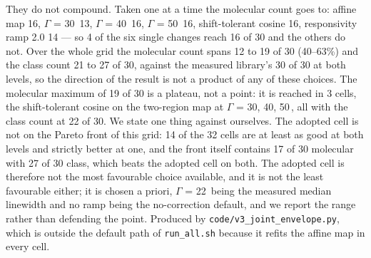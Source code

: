 \begin{table}[htbp]
\begin{flushleft}\footnotesize They do not compound. Taken one at a time the molecular count goes to: affine map 16, $\Gamma$ = 30\,\wn{} 13, $\Gamma$ = 40\,\wn{} 16, $\Gamma$ = 50\,\wn{} 16, shift-tolerant cosine 16, responsivity ramp 2.0 14 --- so 4 of the six single changes reach 16 of 30 and the others do not. Over the whole grid the molecular count spans 12 to 19 of 30 (40--63\%) and the class count 21 to 27 of 30, against the measured library's 30 of 30 at both levels, so the direction of the result is not a product of any of these choices. The molecular maximum of 19 of 30 is a plateau, not a point: it is reached in 3 cells, the shift-tolerant cosine on the two-region map at $\Gamma$ = 30, 40, 50\,\wn{}, all with the class count at 22 of 30. We state one thing against ourselves. The adopted cell is not on the Pareto front of this grid: 14 of the 32 cells are at least as good at both levels and strictly better at one, and the front itself contains 17 of 30 molecular with 27 of 30 class, which beats the adopted cell on both. The adopted cell is therefore not the most favourable choice available, and it is not the least favourable either; it is chosen a priori, $\Gamma$ = 22\,\wn{} being the measured median linewidth and no ramp being the no-correction default, and we report the range rather than defending the point. Produced by \texttt{code/v3\_joint\_envelope.py}, which is outside the default path of \texttt{run\_all.sh} because it refits the affine map in every cell.\end{flushleft}
\end{table}
